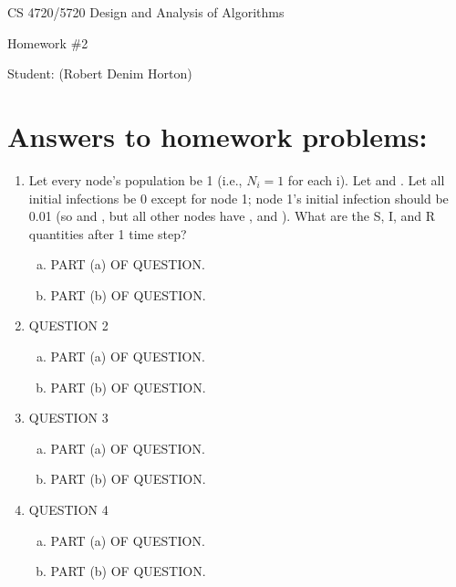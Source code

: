 \documentclass[11pt]{article}
\begin{document}
 

\rhead{\today}

\begin{center}\begin{Large}
CS 4720/5720 Design and Analysis of Algorithms

Homework \#2

Student: (Robert Denim Horton)
\end{Large}
\end{center}


\section*{Answers to homework problems:}

\begin{enumerate}
\item Let every node's population be 1 (i.e., $N_i = 1$  for each i). Let  and . Let all initial infections be 0 except for node 1; node 1's initial infection should be 0.01 (so  and , but all other nodes have ,  and ). What are the S, I, and R quantities after 1 time step?
	\begin{enumerate}[(a)]
		\item PART (a) OF QUESTION.
		\item PART (b) OF QUESTION.
	\end{enumerate}
\item QUESTION 2
	\begin{enumerate}[(a)]
		\item PART (a) OF QUESTION.
		\item PART (b) OF QUESTION.
	\end{enumerate}
\item QUESTION 3
	\begin{enumerate}[(a)]
		\item PART (a) OF QUESTION.
		\item PART (b) OF QUESTION.
	\end{enumerate}
\item QUESTION 4
	\begin{enumerate}[(a)]
		\item PART (a) OF QUESTION.
		\item PART (b) OF QUESTION.
	\end{enumerate}
\end{enumerate}
\end{document}
